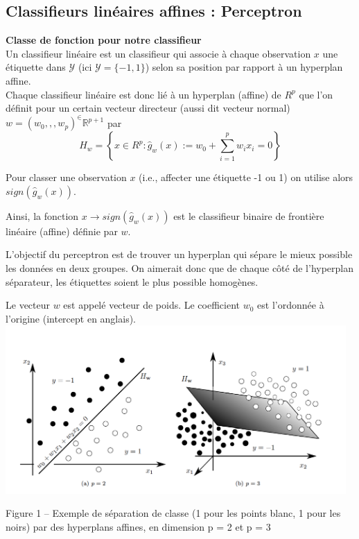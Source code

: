 \documentclass[a4paper]{article}
\theoremstyle{plain}
\begin{document}
\pagebreak
\subsection{Classifieurs linéaires affines : Perceptron}

\textbf{Classe de fonction pour notre classifieur}\\

Un classifieur linéaire est un classifieur qui associe à chaque observation $x$ une étiquette dans $\mathcal{Y}$ (ici $\mathcal{Y} = \{-1,1\}$) selon sa position par rapport à un hyperplan affine. \\

Chaque classifieur linéaire est donc lié à
un hyperplan (affine) de $R^p$ que l’on définit pour un certain vecteur directeur (aussi dit vecteur normal)
$w = (w_0,,,w_p)^ \in \mathbb{R}^{p+1}$ par
$$H_w = \left\{ x\in R^p : \hat g_w(x):=w_0 + \sum_{i=1}^{p}w_ix_i =0 \right\}$$

Pour classer une observation $x$ (i.e., affecter une étiquette -1 ou 1) on utilise alors $sign(\hat g_w(x))$.

Ainsi, la fonction $x \rightarrow sign(\hat g_w(x))$ est le classifieur binaire de frontière linéaire (affine) définie par $w$.

L’objectif du perceptron est de trouver un hyperplan qui sépare le mieux possible les données en deux groupes. On aimerait donc que de chaque côté de l’hyperplan séparateur, les étiquettes soient le plus
possible homogènes. 

Le vecteur $w$ est appelé vecteur de poids. Le coefficient $w_0$ est l’ordonnée à l’origine (intercept en anglais).\\

\includegraphics[width=13cm]{Perceptron.png}

Figure 1 – Exemple de séparation de classe (1 pour les points blanc, 1 pour les noirs) par des hyperplans
affines, en dimension p = 2 et p = 3
\end{document}
